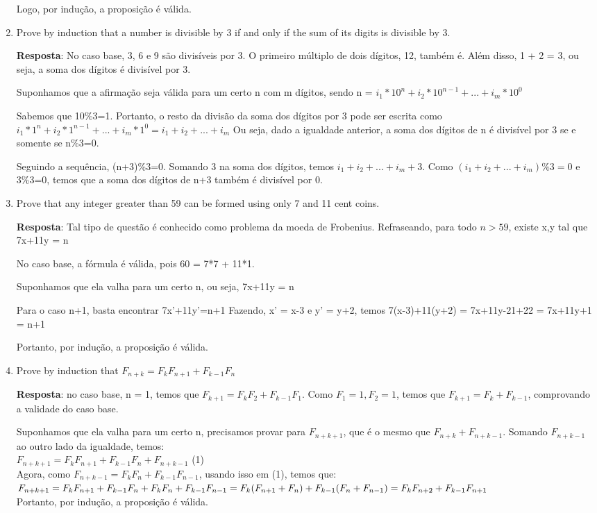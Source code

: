 \documentclass{article}
\begin{document}
\begin{enumerate}
		Logo, por indução, a proposição é válida.
		
		\item Prove by induction that a number is divisible by 3 if and only if the sum of its digits is divisible by 3.
		
		\textbf{Resposta}: No caso base, 3, 6 e 9 são divisíveis por 3. O primeiro múltiplo de dois dígitos, 12, também é. Além disso, 1 + 2 = 3, ou seja, a soma dos dígitos é divisível por 3.
		
		Suponhamos que a afirmação seja válida para um certo n com m dígitos, sendo n = $i_{1}*10^n+i_{2}*10^{n-1}+...+i_{m}*10^{0}$
		
		Sabemos que 10\%3=1. Portanto, o resto da divisão da soma dos dígitos por 3 pode ser escrita como $i_{1}*1^n+i_{2}*1^{n-1}+...+i_{m}*1^{0} = i_{1}+i_{2}+...+i_{m}$
		Ou seja, dado a igualdade anterior, a soma dos dígitos de n é divisível por 3 se e somente se n\%3=0.
		
		Seguindo a sequência, (n+3)\%3=0. Somando 3 na soma dos dígitos, temos $i_{1}+i_{2}+...+i_{m} + 3$. Como $(i_{1}+i_{2}+...+i_{m})\%3 = 0$ e 3\%3=0, temos que a soma dos dígitos de n+3 também é divisível por 0.
		
		\item Prove that any integer greater than 59 can be formed using only 7 and 11 cent coins.
		
		\textbf{Resposta}: Tal tipo de questão é conhecido como problema da moeda de Frobenius. Refraseando, para todo $n>59$, existe x,y tal que 7x+11y = n
		
		No caso base, a fórmula é válida, pois 60 = 7*7 + 11*1.
		
		Suponhamos que ela valha para um certo n, ou seja, 7x+11y = n
		
		Para o caso n+1, basta encontrar 7x'+11y'=n+1
		Fazendo, x' = x-3 e y' = y+2, temos 7(x-3)+11(y+2) = 7x+11y-21+22 = 7x+11y+1 = n+1
		
		Portanto, por indução, a proposição é válida.
		
		\item Prove by induction that $F_{n+k}=F_{k}F_{n+1}+F_{k-1}F_{n}$
		
		\textbf{Resposta}: no caso base, n = 1, temos que $F_{k+1}=F_{k}F_{2}+F_{k-1}F_{1}$. Como $F_{1} = 1, F_{2} = 1$, temos que $F_{k+1}=F_{k}+F_{k-1}$, comprovando a validade do caso base.
		
		Suponhamos que ela valha para um certo n, precisamos provar para $F_{n+k+1}$, que é o mesmo que $F_{n+k} + F_{n+k-1}$. Somando $F_{n+k-1}$ ao outro lado da igualdade, temos:\\ 
		$F_{n+k+1}=F_{k}F_{n+1}+F_{k-1}F_{n}+F_{n+k-1}$ (1)\\
		Agora, como $F_{n+k-1} = F_{k}F_{n}+F_{k-1}F_{n-1}$, usando isso em (1), temos que: \\ $F_{n+k+1}=F_{k}F_{n+1}+F_{k-1}F_{n}+F_{k}F_{n}+F_{k-1}F_{n-1} = \\
		F_{k}(F_{n+1}+F_{n})+F_{k-1}(F_{n}+F_{n-1}) = \\
		F_{k}F_{n+2}+F_{k-1}F_{n+1}$ \\
		Portanto, por indução, a proposição é válida.
		

\end{enumerate}
\end{document}
